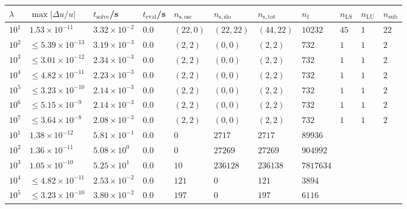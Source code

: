 \begin{tabularx}{\textwidth}{l l X X X X X X X X X}
\hline \hline 
$\lambda$  &  $\max|\Delta u/u|$  &  $t_{\mathrm{solve}}$/\si{\s}  &
$t_{\mathrm{eval}}$/\si{\s}  &  $n_{\mathrm{s,osc}}$  &  $n_{\mathrm{s,slo}}$
&  $n_{\mathrm{s,tot}}$  &  $n_{\mathrm{f}}$  &  $n_{\mathrm{LS}}$  &
$n_{\mathrm{LU}}$  &  $n_{\mathrm{sub}}$ \\ \hline
$10^1$  &  $1.53 \times 10^{-11}$  &  $3.32\times 10^{-2}$  &  $0.0$  &  $(22, 0)$  &  $(22, 22)$  &  $(44, 22)$  &  $10232$  &  $45$  &  $1$  &  $22$\\ 
    $10^2$  &  $\leq 5.39 \times 10^{-13}$  &  $3.19\times 10^{-3}$  &  $0.0$  &  $(2, 2)$  &  $(0, 0)$  &  $(2, 2)$  &  $732$  &  $1$  &  $1$  &  $2$\\ 
    $10^3$  &  $\leq 3.01 \times 10^{-12}$  &  $2.34\times 10^{-3}$  &  $0.0$  &  $(2, 2)$  &  $(0, 0)$  &  $(2, 2)$  &  $732$  &  $1$  &  $1$  &  $2$\\ 
$10^4$  &  $\leq 4.82 \times 10^{-11}$  &  $2.23\times 10^{-3}$  &  $0.0$  &  $(2, 2)$  &  $(0, 0)$  &  $(2, 2)$  &  $732$  &  $1$  &  $1$  &  $2$\\ 
$10^5$  &  $\leq 3.23 \times 10^{-10}$  &  $2.14\times 10^{-3}$  &  $0.0$  &  $(2, 2)$  &  $(0, 0)$  &  $(2, 2)$  &  $732$  &  $1$  &  $1$  &  $2$\\ 
$10^6$  &  $\leq 5.15 \times 10^{-9}$  &  $2.14\times 10^{-3}$   &  $0.0$  &  $(2, 2)$  &  $(0, 0)$  &  $(2, 2)$  &  $732$  &  $1$  &  $1$  &  $2$\\ 
$10^7$  &  $\leq 3.64 \times 10^{-8}$  &  $2.08\times 10^{-3}$  &  $0.0$  &  $(2, 2)$  &  $(0, 0)$  &  $(2, 2)$  &  $732$  &  $1$  &  $1$  &  $2$\\ 
\hline \hline
$10^1$  &  $1.38 \times 10^{-12}$  &  $5.81 \times 10^{-1}$  &  $0.0$  &  $0$  &  $2717$  &  $2717$  &  $89936$ & & &  \\ 
$10^2$  &  $1.36 \times 10^{-11}$  &  $5.08 \times 10^{0}$  &  $0.0$  &  $0$  &  $27269$  &  $27269$  &  $904992$  & & & \\ 
$10^3$  &  $1.05 \times 10^{-10}$  &  $5.25 \times 10^{1}$  &  $0.0$  &  $10$  &  $236128$  &  $236138$  &  $7817634$  & & & \\ 
    $10^4$  &  $\leq 4.82 \times 10^{-11}$  &  $2.53 \times 10^{-2}$  &  $0.0$  &  $121$  &  $0$  &  $121$  &  $3894$  & & & \\ 
    $10^5$  &  $\leq 3.23 \times 10^{-10}$  &  $3.80 \times 10^{-2}$  &  $0.0$  &  $197$  &  $0$  &  $197$  &  $6116$  & & & \\ 

\end{tabularx}

